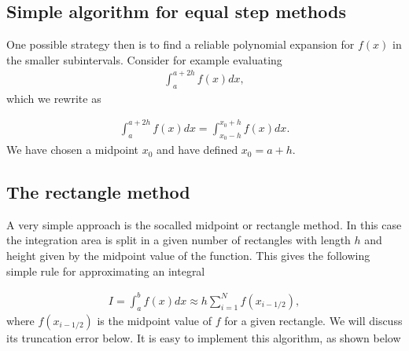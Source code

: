 \documentclass[letterpaper,10pt,english]{sphinxmanual}
\begin{document}
\subsection{Simple algorithm for equal step methods}
\label{\detokenize{chapter3:id2}}
One possible strategy then is to find a reliable polynomial expansion for \(f(x)\) in the smaller
subintervals. Consider for example evaluating
\begin{equation*}
\begin{split}
\int_a^{a+2h}f(x)dx,
\end{split}
\end{equation*}
which we rewrite as




\begin{equation*}
\begin{split}
\begin{equation}
\int_a^{a+2h}f(x)dx=\int_{x_0-h}^{x_0+h}f(x)dx.
\label{eq:hhint} \tag{18}
\end{equation}
\end{split}
\end{equation*}
We have chosen a midpoint \(x_0\) and have defined \(x_0=a+h\).




\subsection{The rectangle method}
\label{\detokenize{chapter3:the-rectangle-method}}
A very simple approach is the so\sphinxhyphen{}called midpoint or rectangle method.
In this case the integration area is split in a given number of rectangles with length \(h\) and height given by the mid\sphinxhyphen{}point value of the function.  This gives the following simple rule for approximating an integral




\begin{equation*}
\begin{split}
\begin{equation}
I=\int_a^bf(x) dx \approx  h\sum_{i=1}^N f(x_{i-1/2}), 
\label{eq:rectangle} \tag{19}
\end{equation}
\end{split}
\end{equation*}
where \(f(x_{i-1/2})\) is the midpoint value of \(f\) for a given rectangle. We will discuss its truncation
error below.  It is easy to implement this algorithm,  as shown below
\end{document}

